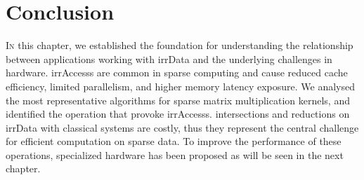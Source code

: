 
\section{Conclusion}
\label{sec:bg:conclu}

\lettrine{I}{n} this chapter, we established the foundation for understanding the relationship between applications working with \gls{irrData} and the underlying challenges in hardware.
\Glspl{irrAccess} are common in sparse computing and cause reduced cache efficiency, limited parallelism, and higher memory latency exposure.
We analysed the most representative algorithms for sparse matrix multiplication kernels, and identified the operation that provoke \glspl{irrAccess}.
\Glspl{intersection} and \glspl{reduction} on \gls{irrData} with classical systems are costly, thus they represent the central challenge for efficient computation on sparse data.
To improve the performance of these operations, specialized hardware has been proposed as will be seen in the next chapter.

\bigskip\bigskip

